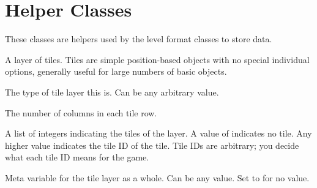 \documentclass[letterpaper,10pt,english]{sphinxmanual}
\begin{document}
\chapter{Helper Classes}
\label{\detokenize{index:helper-classes}}
These classes are helpers used by the level format classes to store
data.

\begin{fulllineitems}
\label{\detokenize{index:ulvl.TileLayer}}
A layer of tiles.  Tiles are simple position-based objects with no
special individual options, generally useful for large numbers of
basic objects.

\begin{fulllineitems}
\label{\detokenize{index:ulvl.TileLayer.type}}
The type of tile layer this is. Can be any arbitrary value.

\end{fulllineitems}


\begin{fulllineitems}
\label{\detokenize{index:ulvl.TileLayer.columns}}
The number of columns in each tile row.

\end{fulllineitems}


\begin{fulllineitems}
\label{\detokenize{index:ulvl.TileLayer.tiles}}
A list of integers indicating the tiles of the layer.  A value of
 indicates no tile.  Any higher value indicates the tile ID
of the tile.  Tile IDs are arbitrary; you decide what each tile
ID means for the game.

\end{fulllineitems}


\begin{fulllineitems}
\label{\detokenize{index:ulvl.TileLayer.meta}}
Meta variable for the tile layer as a whole.  Can be any value.
Set to  for no value.

\end{fulllineitems}


\end{fulllineitems}
\end{document}
